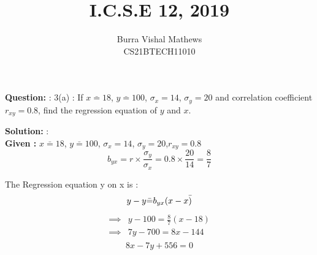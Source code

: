 \documentclass[journal,12pt,twocolumn]{IEEEtran}
\begin{document}



\providecommand{\pr}[1]{\ensuremath{\Pr\left(#1\right)}}
\providecommand{\qfunc}[1]{\ensuremath{Q\left(#1\right)}}
\providecommand{\sbrak}[1]{\ensuremath{{}\left[#1\right]}}
\providecommand{\lsbrak}[1]{\ensuremath{{}\left[#1\right.}}
\providecommand{\rsbrak}[1]{\ensuremath{{}\left.#1\right]}}
\providecommand{\brak}[1]{\ensuremath{\left(#1\right)}}
\providecommand{\lbrak}[1]{\ensuremath{\left(#1\right.}}
\providecommand{\rbrak}[1]{\ensuremath{\left.#1\right)}}
\providecommand{\cbrak}[1]{\ensuremath{\left\{#1\right\}}}
\providecommand{\lcbrak}[1]{\ensuremath{\left\{#1\right.}}
\providecommand{\rcbrak}[1]{\ensuremath{\left.#1\right\}}}
\theoremstyle{remark}
\newtheorem{rem}{Remark}
\newcommand{\sgn}{\mathop{\mathrm{sgn}}}

\providecommand{\system}{\overset{\mathcal{H}}{ \longleftrightarrow}}
\newcommand{\question}{\noindent \textbf{Question: }}	
\newcommand{\solution}{\noindent \textbf{Solution: }}

\providecommand{\dec}[2]{\ensuremath{\overset{#1}{\underset{#2}{\gtrless}}}}

\vspace{3cm}
\title{I.C.S.E 12, 2019}

\author{ Burra Vishal Mathews\\CS21BTECH11010}
	


\maketitle
\question : 3(a) : If $x\bar=18$, $y\bar=100$, $\sigma_x=14$, $\sigma_y=20$ and correlation coefficient $r_{xy}=0.8$, find the regression equation of $y$ and $x$. 

\solution : \\
\textbf{Given : }$x\bar=18$, $y\bar=100$, $\sigma_x=14$, $\sigma_y=20$,$r_{xy}=0.8$\\
$$b_{yx}=r\times\frac{\sigma_y}{\sigma_x}=0.8\times\frac{20}{14}=\frac{8}{7}$$

The Regression equation y on x is :
\begin{equation}
    y-y\bar = b_{yx}(x-x\bar)\\
\end{equation}
\begin{align*}
    \implies&y-100=\frac{8}{7}(x-18)\\
    \implies&7y-700=8x-144\\
\end{align*}
\begin{equation}
    8x-7y+556=0
\end{equation}
\end{document}
